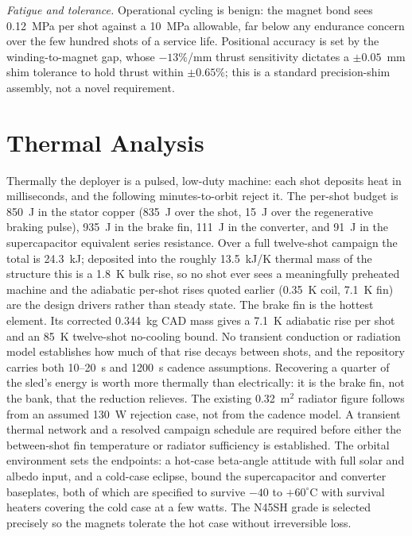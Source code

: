 \documentclass[conference]{IEEEtran}
\begin{document}
\emph{Fatigue and tolerance.} Operational cycling is benign: the magnet bond sees 0.12~MPa per shot against a 10~MPa allowable, far below any endurance concern over the few hundred shots of a service life. Positional accuracy is set by the winding-to-magnet gap, whose $-13\%$/mm thrust sensitivity dictates a $\pm0.05$~mm shim tolerance to hold thrust within $\pm0.65\%$; this is a standard precision-shim assembly, not a novel requirement.

\section{Thermal Analysis}\label{sec:thermal}
Thermally the deployer is a pulsed, low-duty machine: each shot deposits heat in milliseconds, and the following minutes-to-orbit reject it. The per-shot budget is 850~J in the stator copper (835~J over the shot, 15~J over the regenerative braking pulse), 935~J in the brake fin, 111~J in the converter, and 91~J in the supercapacitor equivalent series resistance. Over a full twelve-shot campaign the total is 24.3~kJ; deposited into the roughly 13.5~kJ/K thermal mass of the structure this is a 1.8~K bulk rise, so no shot ever sees a meaningfully preheated machine and the adiabatic per-shot rises quoted earlier (0.35~K coil, 7.1~K fin) are the design drivers rather than steady state. The brake fin is the hottest element. Its corrected 0.344~kg CAD mass gives a 7.1~K adiabatic rise per shot and an 85~K twelve-shot no-cooling bound. No transient conduction or radiation model establishes how much of that rise decays between shots, and the repository carries both 10--20~s and 1200~s cadence assumptions. Recovering a quarter of the sled's energy is worth more thermally than electrically: it is the brake fin, not the bank, that the reduction relieves. The existing 0.32~m$^2$ radiator figure follows from an assumed 130~W rejection case, not from the cadence model. A transient thermal network and a resolved campaign schedule are required before either the between-shot fin temperature or radiator sufficiency is established. The orbital environment sets the endpoints: a hot-case beta-angle attitude with full solar and albedo input, and a cold-case eclipse, bound the supercapacitor and converter baseplates, both of which are specified to survive $-40$ to $+60^\circ$C with survival heaters covering the cold case at a few watts. The N45SH grade is selected precisely so the magnets tolerate the hot case without irreversible loss.
\end{document}
